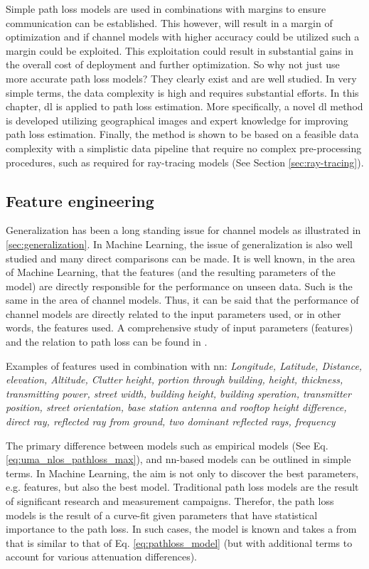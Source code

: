 Simple path loss models are used in combinations with margins to ensure communication can be established. This however, will result in a margin of optimization and if channel models with higher accuracy could be utilized such a margin could be exploited. This exploitation could result in substantial gains in the overall cost of deployment and further optimization. So why not just use more accurate path loss models? They clearly exist and are well studied. In very simple terms, the data complexity is high and requires substantial efforts. In this chapter, \gls{dl} is applied to path loss estimation. More specifically, a novel \gls{dl} method is developed utilizing geographical images and expert knowledge for improving path loss estimation. Finally, the method is shown to be based on a feasible data complexity with a simplistic data pipeline that require no complex pre-processing procedures, such as required for ray-tracing models (See Section \ref{sec:ray-tracing}).

\subsection{Feature engineering}

Generalization has been a long standing issue for channel models as illustrated in \ref{sec:generalization}. In Machine Learning, the issue of generalization is also well studied and many direct comparisons can be made. It is well known, in the area of Machine Learning, that the features (and the resulting parameters of the model) are directly responsible for the performance on unseen data.  Such is the same in the area of channel models. Thus, it can be said that the performance of channel models are directly related to the input parameters used, or in other words, the features used. A comprehensive study of input parameters (features) and the relation to path loss can be found in \cite{Popoola2019}. 
 
Examples of features used in combination with \gls{nn}: \emph{Longitude, Latitude, Distance, elevation, Altitude, Clutter height, portion through building, height, thickness, transmitting power, street width, building height, building speration, transmitter position, street orientation, base station antenna and rooftop height difference, direct ray, reflected ray from ground, two dominant reflected rays, frequency}

The primary difference between models such as empirical models (See Eq. \ref{eq:uma_nlos_pathloss_max}), and \gls{nn}-based models can be outlined in simple terms. In Machine Learning, the aim is not only to discover the best parameters, e.g. features, but also the best model. Traditional path loss models are the result of significant research and measurement campaigns. Therefor, the path loss models is the result of a curve-fit given parameters that have statistical importance to the path loss. In such cases, the model is known and takes a from that is similar to that of Eq. \ref{eq:pathloss_model} (but with additional terms to account for various attenuation differences).

